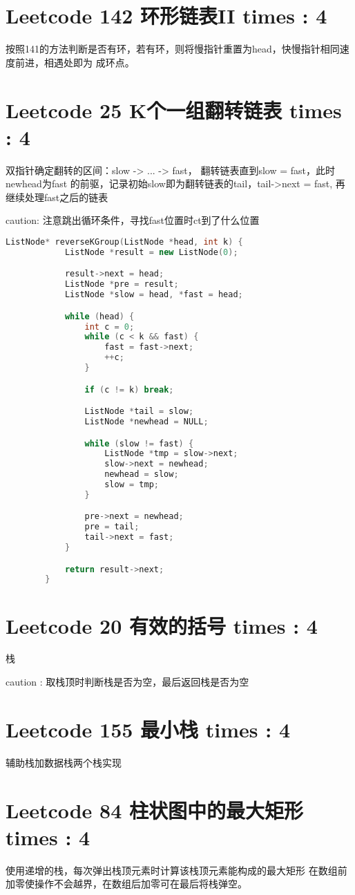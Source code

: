 \documentclass[UTF8]{ctexart}
\begin{document}
\section{Leetcode 142 环形链表II times : 4}
按照141的方法判断是否有环，若有环，则将慢指针重置为head，快慢指针相同速度前进，相遇处即为
成环点。

\section{Leetcode 25 K个一组翻转链表 times : 4}
双指针确定翻转的区间：slow -> ...  -> fast， 翻转链表直到slow = fast，此时newhead为fast
的前驱，记录初始slow即为翻转链表的tail，tail->next = fast, 再继续处理fast之后的链表

caution: 注意跳出循环条件，寻找fast位置时ct到了什么位置
\begin{framed}
	\begin{lstlisting}[language=C++]
		ListNode* reverseKGroup(ListNode *head, int k) {
			ListNode *result = new ListNode(0);

			result->next = head;
			ListNode *pre = result;
			ListNode *slow = head, *fast = head;

			while (head) {
				int c = 0;
				while (c < k && fast) {
					fast = fast->next;
					++c;
				}

				if (c != k) break;

				ListNode *tail = slow;
				ListNode *newhead = NULL;

				while (slow != fast) {
					ListNode *tmp = slow->next;
					slow->next = newhead;
					newhead = slow;
					slow = tmp;
				}

				pre->next = newhead;
				pre = tail;
				tail->next = fast;
			}

			return result->next;
		}
	\end{lstlisting}
\end{framed}

\section{Leetcode 20 有效的括号 times : 4}
栈

caution : 取栈顶时判断栈是否为空，最后返回栈是否为空

\section{Leetcode 155 最小栈 times : 4}
辅助栈加数据栈两个栈实现

\section{Leetcode 84 柱状图中的最大矩形 times : 4}
使用递增的栈，每次弹出栈顶元素时计算该栈顶元素能构成的最大矩形
在数组前加零使操作不会越界，在数组后加零可在最后将栈弹空。
\end{document}
